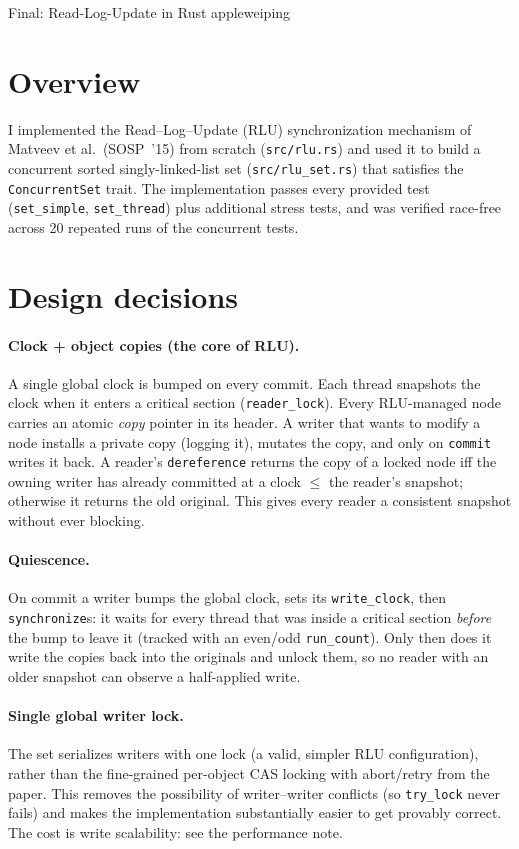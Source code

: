 \documentclass[11pt]{article}
\begin{document}
\hwtitle
  {Final: Read-Log-Update in Rust}
  {appleweiping} %

\section*{Overview}

I implemented the Read--Log--Update (RLU) synchronization mechanism of Matveev
et al.\ (SOSP~'15) from scratch (\texttt{src/rlu.rs}) and used it to build a
concurrent sorted singly-linked-list set (\texttt{src/rlu\_set.rs}) that
satisfies the \texttt{ConcurrentSet} trait. The implementation passes every
provided test (\texttt{set\_simple}, \texttt{set\_thread}) plus additional
stress tests, and was verified race-free across 20 repeated runs of the
concurrent tests.

\section*{Design decisions}

\paragraph{Clock + object copies (the core of RLU).}
A single global clock is bumped on every commit. Each thread snapshots the clock
when it enters a critical section (\texttt{reader\_lock}). Every RLU-managed node
carries an atomic \emph{copy} pointer in its header. A writer that wants to
modify a node installs a private copy (logging it), mutates the copy, and only on
\texttt{commit} writes it back. A reader's \texttt{dereference} returns the copy
of a locked node iff the owning writer has already committed at a clock $\le$ the
reader's snapshot; otherwise it returns the old original. This gives every reader
a consistent snapshot without ever blocking.

\paragraph{Quiescence.}
On commit a writer bumps the global clock, sets its \texttt{write\_clock}, then
\texttt{synchronize}s: it waits for every thread that was inside a critical
section \emph{before} the bump to leave it (tracked with an even/odd
\texttt{run\_count}). Only then does it write the copies back into the originals
and unlock them, so no reader with an older snapshot can observe a half-applied
write.

\paragraph{Single global writer lock.}
The set serializes writers with one lock (a valid, simpler RLU configuration),
rather than the fine-grained per-object CAS locking with abort/retry from the
paper. This removes the possibility of writer--writer conflicts (so
\texttt{try\_lock} never fails) and makes the implementation substantially easier
to get provably correct. The cost is write scalability: see the performance note.
\end{document}
